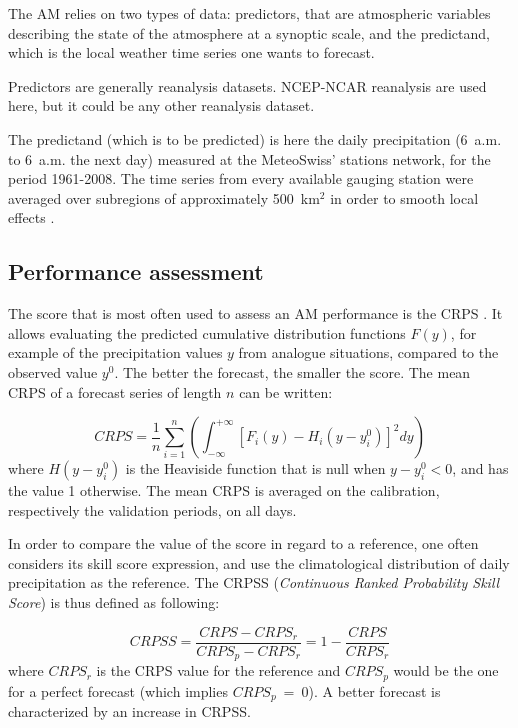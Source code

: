 \documentclass[5p]{elsarticle}
\begin{document}
The AM relies on two types of data: predictors, that are atmospheric variables describing the state of the atmosphere at a synoptic scale, and the predictand, which is the local weather time series one wants to forecast.

Predictors are generally reanalysis datasets. NCEP-NCAR reanalysis \citep[6-hourly, 17 pressure levels at a resolution of 2.5\degree, see][]{Kalnay1996} are used here, but it could be any other reanalysis dataset.

The predictand (which is to be predicted) is here the daily precipitation (6~a.m. to 6~a.m. the next day) measured at the MeteoSwiss' stations network, for the period 1961-2008. The time series from every available gauging station were averaged over subregions of approximately 500~km$^{2}$ in order to smooth local effects \citep{Obled2002, Marty2012}.


\subsection{Performance assessment}
\label{sec:score}

The score that is most often used to assess an AM performance is the CRPS \citep[Continuous Ranked Probability Score,][]{Brown1974, Matheson1976, Hersbach2000}. It allows evaluating the predicted cumulative distribution functions $F(y)$, for example of the precipitation values $y$ from analogue situations, compared to the observed value $y^{0}$. The better the forecast, the smaller the score. The mean CRPS of a forecast series of length $n$ can be written:

\begin{equation}
\label{eq:CRPS}
CRPS = \frac{1}{n} \sum_{i=1}^{n} \left(  \int_{-\infty}^{+\infty} \left[ F_{i}(y)-H_{i}(y-y_{i}^{0})\right]^{2} dy \right) 
\end{equation}
where $H(y-y_{i}^{0})$ is the Heaviside function that is null when $y-y_{i}^{0}<0$, and has the value 1 otherwise. The mean CRPS is averaged on the calibration, respectively the validation periods, on all days.

In order to compare the value of the score in regard to a reference, one often considers its skill score expression, and use the climatological distribution of daily precipitation as the reference. The CRPSS (\textit{Continuous Ranked Probability Skill Score}) is thus defined as following:

\begin{equation}
\label{eq:CRPSS}
CRPSS = \frac{CRPS-CRPS_{r}}{CRPS_{p}-CRPS_{r}} = 1-\frac{CRPS}{CRPS_{r}}
\end{equation}
where $CRPS_{r}$ is the CRPS value for the reference and $CRPS_{p}$ would be the one for a perfect forecast (which implies $CRPS_{p}~=~0$). A better forecast is characterized by an increase in CRPSS.
\end{document}

